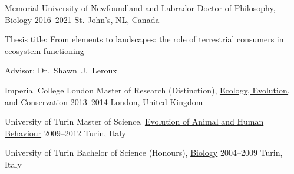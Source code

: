 

\begin{cventries}

  \cventry
    {Memorial University of Newfoundland and Labrador} %
    {Doctor of Philosophy, \href{http://www.mun.ca/biology}{Biology}} %
    {2016--2021} %
    {St. John's, NL, Canada} %
    {
      \begin{cvitems} %
        \item {Thesis title: From elements to landscapes: the role of terrestrial consumers in ecosystem functioning}
        \item {Advisor: Dr.~Shawn~J.~Leroux}
      \end{cvitems}
    }

  \cventry
    {Imperial College London} %
    {Master of Research (Distinction), \href{https://www.imperial.ac.uk/study/pg/life-sciences/ecology-evolution-conservation-research/}{Ecology, Evolution, and Conservation}} %
    {2013--2014} %
    {London, United Kingdom} %
    {}
  
  \cventry
    {University of Turin} %
    {Master of Science, \href{https://goo.gl/rCzbq7}{Evolution of Animal and Human Behaviour}} %
    {2009--2012} %
    {Turin, Italy} %
    {}
  
  \cventry
    {University of Turin} %
    {Bachelor of Science (Honours), \href{http://biologia.campusnet.unito.it/do/home.pl}{Biology}} %
    {2004--2009} %
    {Turin, Italy} %
    {}
\end{cventries}
